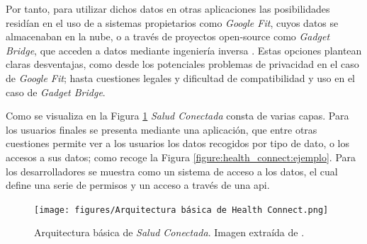         Por tanto, para utilizar dichos datos en otras aplicaciones las posibilidades residían en el uso de a sistemas propietarios como \textit{Google Fit}, cuyos datos se almacenaban en la nube, o a través de proyectos \gls{open-source} como \textit{Gadget Bridge}, que acceden a datos mediante ingeniería inversa \cite{freeyourgadget_gadgetbridge_nodate}. Estas opciones plantean claras desventajas, como desde los potenciales problemas de privacidad en el caso de \textit{Google Fit}; hasta cuestiones legales y dificultad de compatibilidad y uso en el caso de \textit{Gadget Bridge}.
        
        Como se visualiza en la Figura \ref{figure:health_connect:arquitectura} \textit{Salud Conectada} consta de varias capas. Para los usuarios finales se presenta mediante una aplicación, que entre otras cuestiones permite ver a los usuarios los datos recogidos por tipo de dato, o los accesos a sus datos; como recoge la Figura \ref{figure:health_connect:ejemplo}. Para los desarrolladores se muestra como un sistema de acceso a los datos, el cual define una serie de permisos y un acceso a través de una \gls{api}.

        \begin{figure}[h]
            \centering
            \texttt{[image: figures/Arquitectura básica de Health Connect.png]}
            \caption[Arquitectura básica de \textit{Salud Conectada}.]
            {Arquitectura básica de \textit{Salud Conectada}. Imagen extraída de \cite{wilk_introducing_2022}.}
            \label{figure:health_connect:arquitectura}
        \end{figure}

